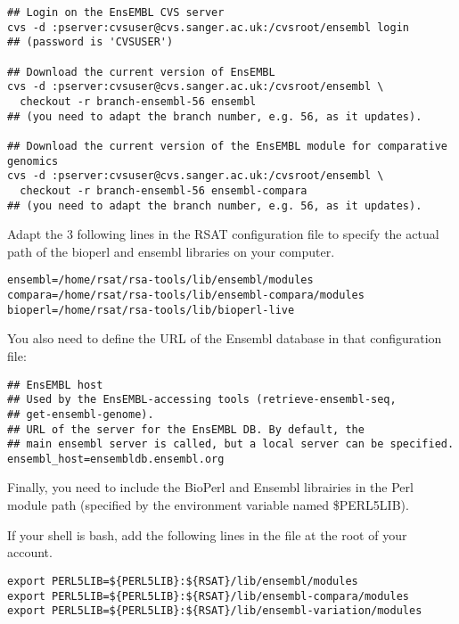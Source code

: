 \documentclass{book}
\begin{document}
\begin{footnotesize}
\begin{verbatim}
## Login on the EnsEMBL CVS server
cvs -d :pserver:cvsuser@cvs.sanger.ac.uk:/cvsroot/ensembl login
## (password is 'CVSUSER')

## Download the current version of EnsEMBL
cvs -d :pserver:cvsuser@cvs.sanger.ac.uk:/cvsroot/ensembl \
  checkout -r branch-ensembl-56 ensembl
## (you need to adapt the branch number, e.g. 56, as it updates).

## Download the current version of the EnsEMBL module for comparative genomics
cvs -d :pserver:cvsuser@cvs.sanger.ac.uk:/cvsroot/ensembl \
  checkout -r branch-ensembl-56 ensembl-compara
## (you need to adapt the branch number, e.g. 56, as it updates).
\end{verbatim}
\end{footnotesize}

Adapt the 3 following lines in the RSAT configuration file
 to specify the actual path of the bioperl
and ensembl libraries on your computer.

\begin{footnotesize}
\begin{verbatim}
ensembl=/home/rsat/rsa-tools/lib/ensembl/modules
compara=/home/rsat/rsa-tools/lib/ensembl-compara/modules
bioperl=/home/rsat/rsa-tools/lib/bioperl-live
\end{verbatim}
\end{footnotesize}

You also need to define the URL of the Ensembl database in that
configuration file:

\begin{footnotesize}
\begin{verbatim}
## EnsEMBL host
## Used by the EnsEMBL-accessing tools (retrieve-ensembl-seq,
## get-ensembl-genome).
## URL of the server for the EnsEMBL DB. By default, the
## main ensembl server is called, but a local server can be specified.
ensembl_host=ensembldb.ensembl.org
\end{verbatim}
\end{footnotesize}

Finally, you need to include the BioPerl and Ensembl librairies in the
Perl module path (specified by the environment variable named
\$PERL5LIB).

If your shell is bash, add the following lines in the file
 at the root of your account.

\begin{footnotesize}
\begin{verbatim}
export PERL5LIB=${PERL5LIB}:${RSAT}/lib/ensembl/modules
export PERL5LIB=${PERL5LIB}:${RSAT}/lib/ensembl-compara/modules
export PERL5LIB=${PERL5LIB}:${RSAT}/lib/ensembl-variation/modules
\end{verbatim}
\end{footnotesize}
\end{document}

